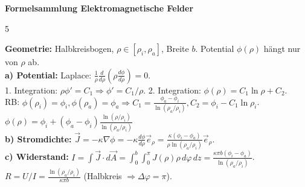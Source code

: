 \documentclass[a4paper, 2pt, landscape]{extarticle}
\begin{document}
\fontsize{3pt}{4pt}\selectfont

\begin{center}
  \textbf{\small Formelsammlung Elektromagnetische Felder}
\end{center}
\vspace{-2pt}

\begin{multicols*}{5}

\begin{tcolorbox}[title={A2: Kreisbogen}, colback=col2, colframe=boxtitle]
\textbf{Geometrie:} Halbkreisbogen, $\rho \in [\rho_i, \rho_a]$, Breite $b$. Potential $\phi(\rho)$ hängt nur von $\rho$ ab. \\
\textbf{a) Potential:} Laplace: $\frac{1}{\rho}\frac{d}{d\rho}(\rho\frac{d\phi}{d\rho}) = 0$. \\
1. Integration: $\rho \phi' = C_1 \Rightarrow \phi' = C_1/\rho$. 2. Integration: $\phi(\rho) = C_1 \ln \rho + C_2$. \\
RB: $\phi(\rho_i)=\phi_i, \phi(\rho_a)=\phi_a \Rightarrow C_1 = \frac{\phi_a-\phi_i}{\ln(\rho_a/\rho_i)}, C_2 = \phi_i - C_1 \ln \rho_i$. \\
$\boxed{\phi(\rho) = \phi_i + (\phi_a-\phi_i) \frac{\ln(\rho/\rho_i)}{\ln(\rho_a/\rho_i)}}$ \\
\textbf{b) Stromdichte:} $\vec{J} = -\kappa \nabla \phi = -\kappa \frac{d\phi}{d\rho} \vec{e}_\rho = \frac{\kappa(\phi_i-\phi_a)}{\rho \ln(\rho_a/\rho_i)} \vec{e}_\rho$. \\
\textbf{c) Widerstand:} $I = \int \vec{J} \cdot d\vec{A} = \int_0^b \int_0^\pi J(\rho) \rho \, d\varphi \, dz = \frac{\kappa \pi b (\phi_i-\phi_a)}{\ln(\rho_a/\rho_i)}$. \\
$\boxed{R = U/I = \frac{\ln(\rho_a/\rho_i)}{\kappa \pi b}}$ (Halbkreis $\Rightarrow \Delta\varphi = \pi$).
\end{tcolorbox}


\end{multicols*}
\end{document}
